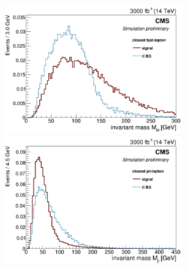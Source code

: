 \documentclass[10pt,a4paper]{article}
\newcommand{\ww}{7.7cm} %
\begin{document}
\begin{figure}[h]
	
  \begin{subfigure}[b]{17cm}
    \begin{minipage}[h!]{\ww}
      \centering
      \includegraphics[width=\ww]{figs/M_bl.png}
    \end{minipage}
    \begin{minipage}[h!]{\ww}
      \centering
      \includegraphics[width=\ww]{figs/M_j1l.png}
    \end{minipage}
  \end{subfigure}


\end{figure}
\end{document}
